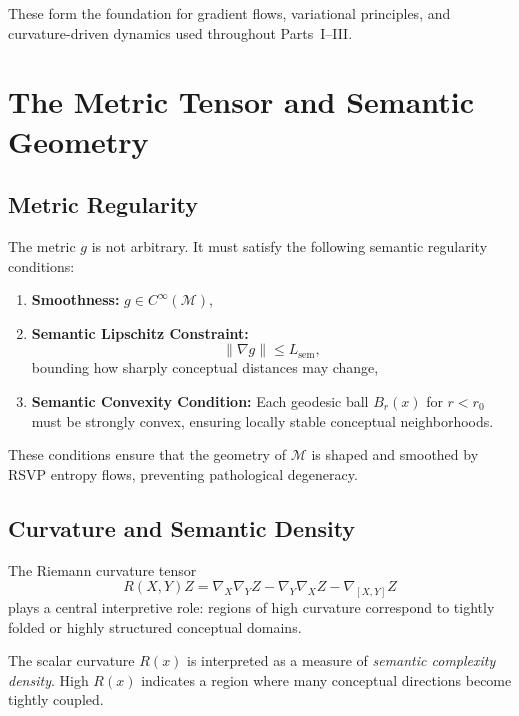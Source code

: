 These form the foundation for gradient flows, variational principles, and curvature-driven dynamics used throughout Parts~I–III.

\section{The Metric Tensor and Semantic Geometry}

\subsection{Metric Regularity}

The metric $g$ is not arbitrary.  
It must satisfy the following semantic regularity conditions:

\begin{enumerate}
\item \textbf{Smoothness:} $g \in C^\infty(\mathcal{M})$,
\item \textbf{Semantic Lipschitz Constraint:}  
      \[
      \| \nabla g \| \leq L_{\mathrm{sem}},
      \]
      bounding how sharply conceptual distances may change,
\item \textbf{Semantic Convexity Condition:}  
      Each geodesic ball $B_r(x)$ for $r < r_0$ must be strongly convex, ensuring locally stable conceptual neighborhoods.
\end{enumerate}

These conditions ensure that the geometry of $\mathcal{M}$ is shaped and smoothed by RSVP entropy flows, preventing pathological degeneracy.

\subsection{Curvature and Semantic Density}

The Riemann curvature tensor
\[
R(X,Y)Z = \nabla_X\nabla_Y Z - \nabla_Y\nabla_XZ - \nabla_{[X,Y]}Z
\]
plays a central interpretive role: regions of high curvature correspond to tightly folded or highly structured conceptual domains.

\begin{definition}
The scalar curvature $R(x)$ is interpreted as a measure of \emph{semantic complexity density}.  
High $R(x)$ indicates a region where many conceptual directions become tightly coupled.
\end{definition}

